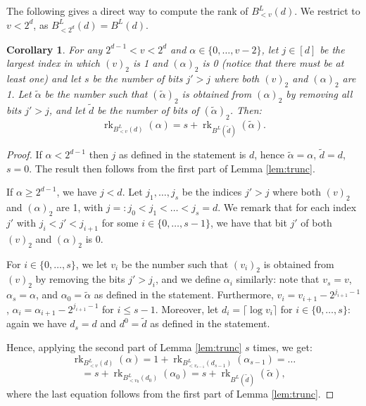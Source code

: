 \documentclass[11pt,a4paper]{article}
\newtheorem{corollary}[theorem]{Corollary}
\newcommand{\1}{\textbf{1}}
\newcommand{\rk}{\operatorname{rk}}
\begin{document}
The following gives a direct way to compute the rank of $B^L_{< v}(d)$. We restrict to $v<2^d$, as $B^L_{<2^d}(d)=B^L(d)$.

\begin{corollary}\label{cor:trunc}
For any $2^{d-1}< v< 2^d$ and $\alpha\in \{0,\dots,v-2\}$, let $j\in[d]$ be the largest index in which $(v)_2$ is 1 and $(\alpha)_2$ is 0 (notice that there must be at least one) and let $s$ be the number of bits $j'>j$ where both $(v)_2$ and $(\alpha)_2$ are 1. Let $\tilde \alpha$ be the number such that $(\tilde{\alpha})_2$ is obtained from $(\alpha)_2$ by removing all bits $j'>j$, and let $\tilde{d}$ be the number of bits of $(\tilde{\alpha})_2$. Then:
\[
\rk_{B^L_{< v}(d)}(\alpha) = s+\rk_{B^L(\tilde{d})}(\tilde{\alpha}).
\]
\end{corollary}

\begin{proof}
If $\alpha< 2^{d-1}$ then $j$ as defined in the statement is $d$, hence $\tilde\alpha=\alpha$, $\tilde d=d$, $s=0$. The result then follows from the first part of Lemma \ref{lem:trunc}.

If $\alpha\ge2^{d-1}$, we have $j<d$. Let $j_1,\dots, j_s$ be the indices $j'>j$ where both $(v)_2$ and $(\alpha)_2$ are 1, with $j=:j_0<j_1<\dots<j_s=d$. We remark that for each index $j'$ with $j_i<j'<j_{i+1}$ for some $i\in\{0,\dots, s-1\}$, we have that bit $j'$ of both $(v)_2$ and $(\alpha)_2$ is 0.

For $i\in\{0,\dots, s\}$, we let $v_i$ be the number such that $(v_i)_2$ is obtained from $(v)_2$ by removing the bits $j'>j_i$, and we define $\alpha_i$ similarly: note that $v_s=v$, $\alpha_s=\alpha$, and $\alpha_0=\tilde \alpha$ as defined in the statement. Furthermore,  $v_i=v_{i+1}-2^{j_{i+1}-1}$, $\alpha_i=\alpha_{i+1}-2^{j_{i+1}-1}$  for $i\leq s-1$. Moreover, let $d_i=\lceil \log v_i \rceil$ for $i\in\{0,\dots, s\}$: again we have $d_s=d$ and $d^0=\tilde d$ as defined in the statement.

Hence, applying the second part of Lemma \ref{lem:trunc} $s$ times, we get:
\[\rk_{B^L_{< v}(d)}(\alpha)=1+\rk_{B^L_{< v_{s-1}}(d_{s-1})}(\alpha_{s-1})=\dots\]
\[
=s + \rk_{B^L_{< v_{0}}(d_{0})}(\alpha_{0})= s+ \rk_{B^L(\tilde{d})}(\tilde{\alpha}),
\]
where the last equation follows from the first part of Lemma \ref{lem:trunc}.
\end{proof}
\end{document}
